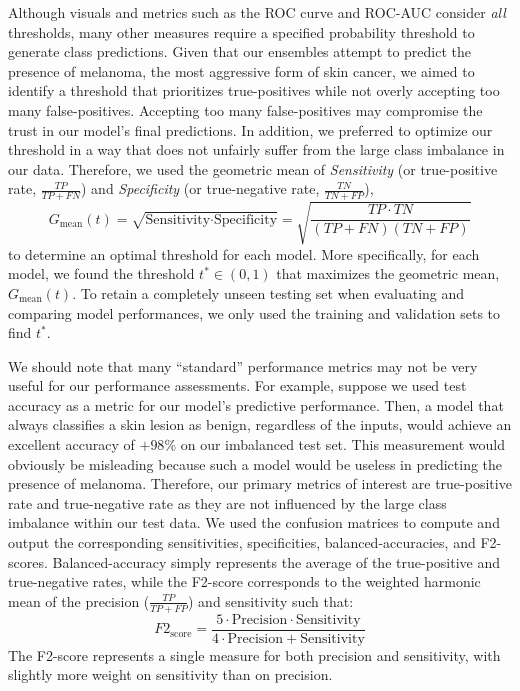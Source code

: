 \documentclass [MAS] {uclathes}
\begin{document}
Although visuals and metrics such as the ROC curve and ROC-AUC consider \textit{all} thresholds, many other measures require a specified probability threshold to generate class predictions. Given that our ensembles attempt to predict the presence of melanoma, the most aggressive form of skin cancer, we aimed to identify a threshold that prioritizes true-positives while not overly accepting too many false-positives. Accepting too many false-positives may compromise the trust in our model's final predictions. In addition, we preferred to optimize our threshold in a way that does not unfairly suffer from the large class imbalance in our data. Therefore, we used the geometric mean of \textit{Sensitivity} (or true-positive rate, $\frac{TP}{TP+FN}$) and \textit{Specificity} (or true-negative rate, $\frac{TN}{TN+FP}$), $$G_{\text{mean}}(t) = \sqrt{\text{Sensitivity} \cdot \text{Specificity}} = \sqrt{\frac{TP \cdot TN }{(TP + FN)(TN + FP)}}$$ to determine an optimal threshold for each model. More specifically, for each model, we found the threshold $t^* \in (0, 1)$ that maximizes the geometric mean, $G_{\text{mean}}(t)$. To retain a completely unseen testing set when evaluating and comparing model performances, we only used the training and validation sets to find $t^*$.

We should note that many ``standard'' performance metrics may not be very useful for our performance assessments. For example, suppose we used test accuracy as a metric for our model's predictive performance. Then, a model that always classifies a skin lesion as benign, regardless of the inputs, would achieve an excellent accuracy of $+98$\% on our imbalanced test set. This measurement would obviously be misleading because such a model would be useless in predicting the presence of melanoma. Therefore, our primary metrics of interest are true-positive rate and true-negative rate as they are not influenced by the large class imbalance within our test data. We used the confusion matrices to compute and output the corresponding sensitivities, specificities, balanced-accuracies, and F2-scores. Balanced-accuracy simply represents the average of the true-positive and true-negative rates, while the F2-score corresponds to the weighted harmonic mean of the precision ($\frac{TP}{TP + FP}$) and sensitivity such that: $$F2_{\text{score}} = \frac{5 \cdot \text{Precision} \cdot \text{Sensitivity}}{4 \cdot \text{Precision} +\text{Sensitivity}}$$ The F2-score represents a single measure for both precision and sensitivity, with slightly more weight on sensitivity than on precision.
\end{document}
